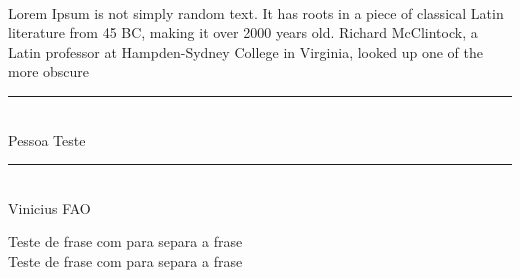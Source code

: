 \documentclass[12pt, a4paper, onside]{article}
\begin{document}
\dotfill\\
Lorem Ipsum is not simply random text.
It has roots in a piece of classical Latin literature from 45 BC,
making it over 2000 years old. Richard McClintock, a Latin professor
at Hampden-Sydney College in Virginia, looked up one of the more obscure\\
\begin{center}
    \rule{10cm}{0.02cm}\\
    Pessoa Teste

    \vspace{2cm}

    \rule{10cm}{0.02cm}\\
    Vinicius FAO
\end{center}

Teste de frase com \hspace{1cm} para separa a frase\\
Teste de frase com              para separa a frase
\end{document}
